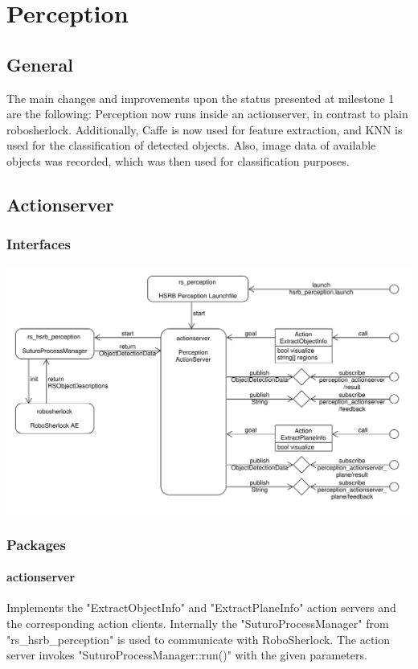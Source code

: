 \documentclass[main.tex]{subfiles}
\begin{document}
	
	\chapter{Perception}
		
		\section{General}
		The main changes and improvements upon the status presented at milestone 1 are the following: Perception now runs inside an actionserver, in contrast to 				plain robosherlock. Additionally, Caffe is now used for feature extraction, and KNN is used for the classification of detected objects. Also, image data of 		available objects was recorded, which was then used for classification purposes.
		
		\section{Actionserver}
			\subsection{Interfaces}
			\includegraphics[width=\textwidth]{../architecture/perception_architecture/perception.pdf}
			
			\subsection{Packages}
			\subsubsection{actionserver}
			Implements the "ExtractObjectInfo" and "ExtractPlaneInfo" action servers and the corresponding action clients.
			Internally the "SuturoProcessManager" from "rs\_hsrb\_perception" is used to communicate with RoboSherlock.
			The action server invokes "SuturoProcessManager::run()" with the given parameters. 
\end{document}
